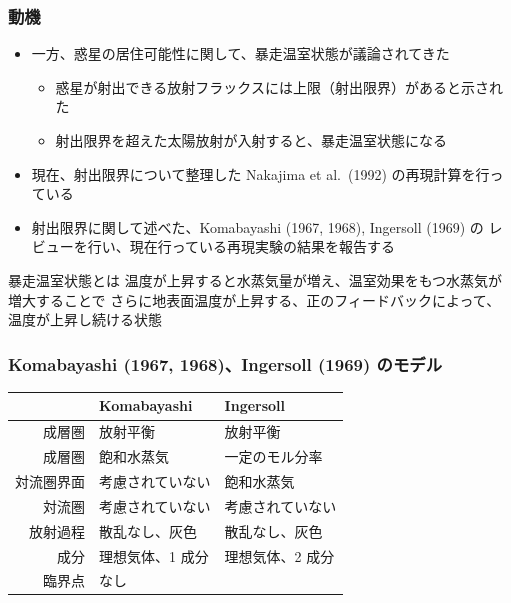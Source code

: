 \documentclass[aspectratio=149]{beamer}
\begin{document}
\begin{frame}
	\frametitle{動機}
	\begin{itemize}
		\item 一方、惑星の居住可能性に関して、暴走温室状態が議論されてきた
			\begin{itemize}
				\item 惑星が射出できる放射フラックスには上限（射出限界）があると示された
				\item 射出限界を超えた太陽放射が入射すると、暴走温室状態になる
			\end{itemize}
		\item 現在、射出限界について整理した Nakajima et al.\ (1992) の再現計算を行っている
		\item 射出限界に関して述べた、Komabayashi (1967, 1968), Ingersoll (1969) の
			レビューを行い、現在行っている再現実験の結果を報告する
	\end{itemize}
	\begin{block}{暴走温室状態とは}
		\small
		温度が上昇すると水蒸気量が増え、温室効果をもつ水蒸気が増大することで
		さらに地表面温度が上昇する、正のフィードバックによって、温度が上昇し続ける状態
	\end{block}
\end{frame}

\begin{frame}
	\frametitle{Komabayashi (1967, 1968)、Ingersoll (1969) のモデル}
	
			\small
				\centering
				\begin{tabular}{rll}
					\hline
					&Komabayashi&Ingersoll\\
					\hline
					成層圏&放射平衡&放射平衡\\
					成層圏&飽和水蒸気&一定のモル分率\\
					対流圏界面&考慮されていない&飽和水蒸気\\
					対流圏&考慮されていない&考慮されていない\\
					放射過程&散乱なし、灰色&散乱なし、灰色\\
					成分&理想気体、1 成分&理想気体、2 成分\\
					臨界点&なし\\
					\hline
				\end{tabular}
\end{frame}
\end{document}
